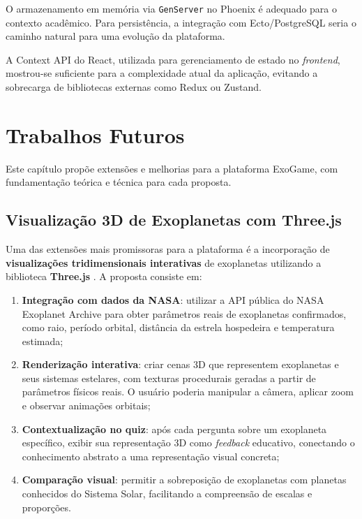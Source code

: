 \documentclass[
	12pt,
	openany,
	oneside,
	a4paper,
	english,
	brazil
]{abntex2}
\begin{document}
O armazenamento em memória via \texttt{GenServer} no Phoenix é adequado para o contexto acadêmico. Para persistência, a integração com Ecto/PostgreSQL seria o caminho natural para uma evolução da plataforma.

A Context API do React, utilizada para gerenciamento de estado no \textit{frontend}, mostrou-se suficiente para a complexidade atual da aplicação, evitando a sobrecarga de bibliotecas externas como Redux ou Zustand.


\chapter{Trabalhos Futuros}\label{cap:trabalhos_futuros}

Este capítulo propõe extensões e melhorias para a plataforma ExoGame, com fundamentação teórica e técnica para cada proposta.

\section{Visualização 3D de Exoplanetas com Three.js}

Uma das extensões mais promissoras para a plataforma é a incorporação de \textbf{visualizações tridimensionais interativas} de exoplanetas utilizando a biblioteca \textbf{Three.js} \cite{threejs2024}. A proposta consiste em:

\begin{enumerate}
  \item \textbf{Integração com dados da NASA}: utilizar a API pública do NASA Exoplanet Archive \cite{nasaexoplanet2024} para obter parâmetros reais de exoplanetas confirmados, como raio, período orbital, distância da estrela hospedeira e temperatura estimada;
  
  \item \textbf{Renderização interativa}: criar cenas 3D que representem exoplanetas e seus sistemas estelares, com texturas procedurais geradas a partir de parâmetros físicos reais. O usuário poderia manipular a câmera, aplicar zoom e observar animações orbitais;
  
  \item \textbf{Contextualização no quiz}: após cada pergunta sobre um exoplaneta específico, exibir sua representação 3D como \textit{feedback} educativo, conectando o conhecimento abstrato a uma representação visual concreta;
  
  \item \textbf{Comparação visual}: permitir a sobreposição de exoplanetas com planetas conhecidos do Sistema Solar, facilitando a compreensão de escalas e proporções.
\end{enumerate}
\end{document}
